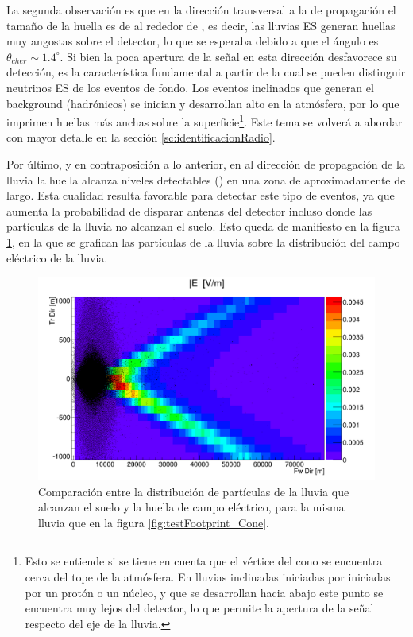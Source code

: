 	La segunda observación es que en la dirección transversal a la de propagación el tamaño de la huella es de al rededor de , es decir, las lluvias ES generan huellas muy angostas sobre el detector, lo que se esperaba debido a que el \'angulo \cher{} es $\theta_{cher}\sim1.4^\circ$.
	Si bien la poca apertura de la se\~nal en esta direcci\'on desfavorece su detecci\'on, es la característica fundamental a partir de la cual se pueden distinguir neutrinos ES de los eventos de fondo.
	Los eventos inclinados que generan el background (hadr\'onicos) se inician y desarrollan alto en la atmósfera, por lo que imprimen huellas m\'as anchas sobre la superficie\footnote{Esto se entiende si se tiene en cuenta que el v\'ertice del cono \cher{} se encuentra cerca del tope de la atm\'osfera. En lluvias inclinadas iniciadas por iniciadas por un prot\'on o un n\'ucleo, y que se desarrollan hacia abajo este punto se encuentra muy lejos del detector, lo que permite la apertura de la se\~nal respecto del eje de la lluvia.}.
	Este tema se volverá a abordar con mayor detalle en la sección \ref{sc:identificacionRadio}.
	 
	Por último, y en contraposición a lo anterior, en al dirección de propagación de la lluvia la huella alcanza niveles detectables () en una zona de aproximadamente  de largo.
	Esta cualidad resulta favorable para detectar este tipo de eventos, ya que aumenta la probabilidad de disparar antenas del detector incluso donde las part\'iculas de la lluvia no alcanzan el suelo.
	Esto queda de manifiesto en la figura \ref{fig:sim_foot_y_part}, en la que se grafican las part\'iculas de la lluvia sobre la distribuci\'on del campo el\'ectrico de la lluvia.
	\begin{figure}[ht!]
		\centering
		\includegraphics[width=\textwidth]{./fig/simulacionRadio/foorPrint_Test_18_89-5_90_25_1238_E_particles}
		\caption{\label{fig:sim_foot_y_part}
		Comparaci\'on entre la distribuci\'on de part\'iculas de la lluvia que alcanzan el suelo y la huella de campo el\'ectrico, para la misma lluvia que en la figura \ref{fig:testFootprint_Cone}.
		}
	\end{figure}
	
